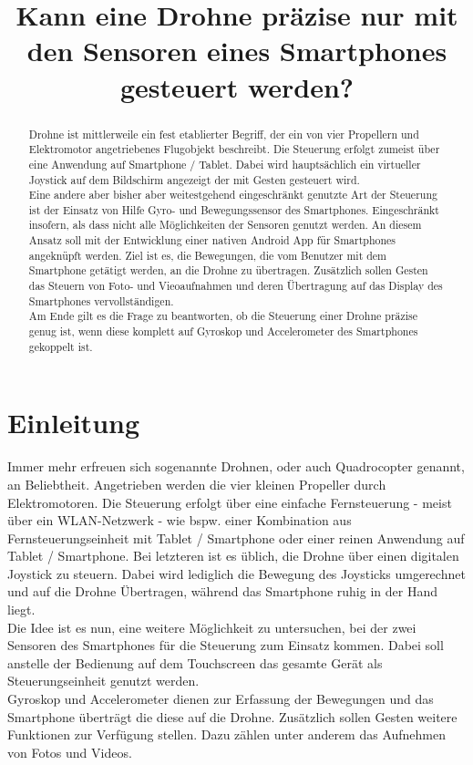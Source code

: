 \documentclass{article}
\title{Kann eine Drohne präzise nur mit den Sensoren eines Smartphones gesteuert werden?}
\begin{document}
\maketitle
\begin{abstract}
Drohne ist mittlerweile ein fest etablierter Begriff, der ein von vier Propellern und Elektromotor angetriebenes Flugobjekt beschreibt. Die Steuerung erfolgt zumeist über eine Anwendung auf Smartphone / Tablet. Dabei wird hauptsächlich ein virtueller Joystick auf dem Bildschirm angezeigt der mit Gesten gesteuert wird.\\ Eine andere aber bisher aber weitestgehend eingeschränkt genutzte Art der Steuerung ist der Einsatz von Hilfe Gyro- und Bewegungssensor des Smartphones. Eingeschränkt insofern, als dass nicht alle Möglichkeiten der Sensoren genutzt werden. An diesem Ansatz soll mit der Entwicklung einer nativen Android App für Smartphones angeknüpft werden. Ziel ist es, die Bewegungen, die vom Benutzer mit dem Smartphone getätigt werden, an die Drohne zu übertragen. Zusätzlich sollen Gesten das Steuern von Foto- und Vieoaufnahmen und deren Übertragung auf das Display des Smartphones vervollständigen.\\ Am Ende gilt es die Frage zu beantworten, ob die Steuerung einer Drohne präzise genug ist, wenn diese komplett auf Gyroskop und Accelerometer des Smartphones gekoppelt ist.

\end{abstract}

\section{Einleitung}
\label{sec:einleitung}
Immer mehr erfreuen sich sogenannte Drohnen, oder auch Quadrocopter genannt, an Beliebtheit. Angetrieben werden die vier kleinen Propeller durch Elektromotoren. Die Steuerung erfolgt über eine einfache Fernsteuerung - meist über ein WLAN-Netzwerk - wie bspw. einer Kombination aus Fernsteuerungseinheit mit Tablet / Smartphone oder einer reinen Anwendung auf Tablet / Smartphone. Bei letzteren ist es üblich, die Drohne über einen digitalen Joystick zu steuern. Dabei wird lediglich die Bewegung des Joysticks umgerechnet und auf die Drohne Übertragen, während das Smartphone ruhig in der Hand liegt.\\ Die Idee ist es nun, eine weitere Möglichkeit zu untersuchen, bei der zwei Sensoren des Smartphones für die Steuerung zum Einsatz kommen. Dabei soll anstelle der Bedienung auf dem Touchscreen das gesamte Gerät als Steuerungseinheit genutzt werden. \\Gyroskop und Accelerometer dienen zur Erfassung der Bewegungen und das Smartphone überträgt die diese auf die Drohne. Zusätzlich sollen Gesten weitere Funktionen zur Verfügung stellen. Dazu zählen unter anderem das Aufnehmen von Fotos und Videos.
\end{document}
